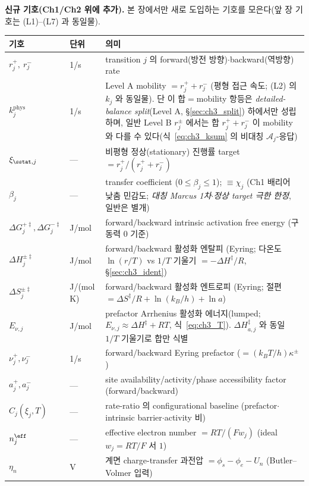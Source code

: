 \textbf{신규 기호(Ch1/Ch2 위에 추가).} 본 장에서만 새로 도입하는 기호를 모은다(앞 장 기호는 (L1)--(L7) 과 동일물).
\begin{longtable}{p{} p{} >{\raggedright\arraybackslash}p{}}
\toprule 기호 & 단위 & 의미 \\ \midrule \endhead
$r_j^+,\ r_j^-$ & 1/s & transition $j$ 의 forward(방전 방향)$\cdot$backward(역방향) rate \\
$k_j^{\mathrm{phys}}$ & 1/s & Level A mobility $=r_j^++r_j^-$ (평형 접근 속도; (L2) 의 $k_j$ 와 동일물). 단 이 합$=$mobility 항등은 \emph{detailed-balance split}(Level A, \S\ref{sec:ch3_split}) 하에서만 성립하며, 일반 Level B $r_j^\pm$ 에서는 합 $r_j^++r_j^-$ 이 mobility 와 다를 수 있다(식~\eqref{eq:ch3_ksum} 의 비대칭 $\mathcal A_j$-응답) \\
$\xi_{\sstat,j}$ & --- & 비평형 정상(stationary) 진행률 target $=r_j^+/(r_j^++r_j^-)$ \\
$\beta_j$ & --- & transfer coefficient ($0\le\beta_j\le1$); \textbf{$\equiv\chi_j$} (Ch1 배리어 낮춤 민감도; \emph{대칭 Marcus 1차$\cdot$정상 target 극한 한정}, 일반은 별개) \\
$\Delta G_j^{+\ddagger},\Delta G_j^{-\ddagger}$ & J/mol & forward/backward intrinsic activation free energy (구동력 $0$ 기준) \\
$\Delta H_j^{\pm\ddagger}$ & J/mol & forward/backward 활성화 엔탈피 (Eyring; 다온도 $\ln(r/T)$ vs $1/T$ 기울기 $=-\Delta H^\ddagger/R$, \S\ref{sec:ch3_ident}) \\
$\Delta S_j^{\pm\ddagger}$ & J/(mol\,K) & forward/backward 활성화 엔트로피 (Eyring; 절편 $=\Delta S^\ddagger/R+\ln(k_B/h)+\ln a$) \\
$E_{\nu,j}$ & J/mol & prefactor Arrhenius 활성화 에너지(lumped; $E_{\nu,j}\approx\Delta H^\ddagger+RT$, 식~\eqref{eq:ch3_T}). $\Delta H_{a,j}^\ddagger$ 와 동일 $1/T$ 기울기로 합만 식별 \\
$\nu_j^+,\nu_j^-$ & 1/s & forward/backward Eyring prefactor ($=(k_BT/h)\kappa^\pm$) \\
$a_j^+,a_j^-$ & --- & site availability/activity/phase accessibility factor (forward/backward) \\
$C_j(\xi_j,T)$ & --- & rate-ratio 의 configurational baseline (prefactor$\cdot$intrinsic barrier$\cdot$activity 비) \\
$n_j^{\eff}$ & --- & effective electron number $=RT/(Fw_j)$ (ideal $w_j=RT/F$ 서 $1$) \\
$\eta_n$ & V & 계면 charge-transfer 과전압 $=\phi_s-\phi_e-U_n$ (Butler--Volmer 입력) \\

\end{longtable}
